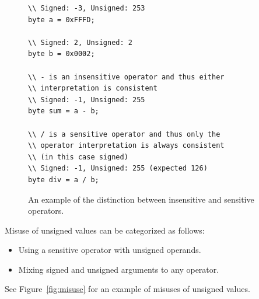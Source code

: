 \begin{figure}[t]
\begin{lstlisting}
\\ Signed: -3, Unsigned: 253
byte a = 0xFFFD;

\\ Signed: 2, Unsigned: 2
byte b = 0x0002;

\\ - is an insensitive operator and thus either
\\ interpretation is consistent
\\ Signed: -1, Unsigned: 255
byte sum = a - b;

\\ / is a sensitive operator and thus only the
\\ operator interpretation is always consistent
\\ (in this case signed)
\\ Signed: -1, Unsigned: 255 (expected 126)
byte div = a / b;
\end{lstlisting}
\vspace{-10pt}
\caption{An example of the distinction between insensitive and sensitive
operators.}
\label{fig:operators}
\end{figure}

Misuse of unsigned values can be categorized as follows:

\begin{itemize}\itemsep 0pt \parskip 0pt
  \item Using a sensitive operator with unsigned operands.
  \item Mixing signed and unsigned arguments to any operator.
\end{itemize}

See Figure~\ref{fig:misuse} for
an example of misuses of unsigned values.

